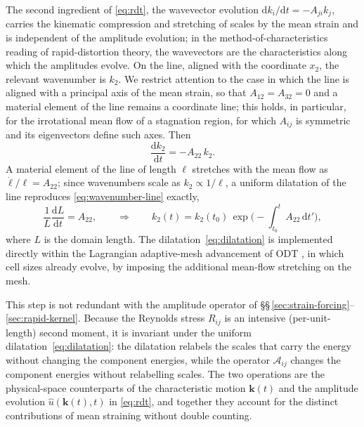 \documentclass[lineno]{JFM-FLM_Au}
\begin{document}
The second ingredient of \eqref{eq:rdt}, the wavevector evolution
$\mathrm{d}k_i/\mathrm{d}t=-A_{ji}k_j$, carries the kinematic compression
and stretching of scales by the mean strain and is independent of the
amplitude evolution; in the method-of-characteristics reading of
rapid-distortion theory, the wavevectors are the characteristics along
which the amplitudes evolve. On the line, aligned with the coordinate
$x_2$, the relevant wavenumber is $k_2$. We restrict attention to the case
in which the line is aligned with a principal axis of the mean strain, so
that $A_{12}=A_{32}=0$ and a material element of the line remains a
coordinate line; this holds, in particular, for the irrotational mean flow
of a stagnation region, for which $A_{ij}$ is symmetric and its
eigenvectors define such axes. Then
\begin{equation}
  \frac{\mathrm{d}k_2}{\mathrm{d}t}=-A_{22}\,k_2 .
  \label{eq:wavenumber-line}
\end{equation}
A material element of the line of length $\ell$ stretches with the mean
flow as $\dot{\ell}/\ell=A_{22}$; since wavenumbers scale as $k_2\propto
1/\ell$, a uniform dilatation of the line reproduces
\eqref{eq:wavenumber-line} exactly,
\begin{equation}
  \frac{1}{L}\frac{\mathrm{d}L}{\mathrm{d}t}=A_{22},
  \qquad\Longrightarrow\qquad
  k_2(t)=k_2(t_0)\,\exp\!\Big(\!-\!\int_{t_0}^{t}A_{22}\,\mathrm{d}t'\Big),
  \label{eq:dilatation}
\end{equation}
where $L$ is the domain length. The dilatation~\eqref{eq:dilatation} is
implemented directly within the Lagrangian adaptive-mesh advancement of
ODT \citep{Lignell2013}, in which cell sizes already evolve, by imposing
the additional mean-flow stretching on the mesh.

This step is not redundant with the amplitude operator of
\S\S\,\ref{sec:strain-forcing}--\ref{sec:rapid-kernel}. Because the
Reynolds stress $R_{ij}$ is an intensive (per-unit-length) second moment,
it is invariant under the uniform dilatation~\eqref{eq:dilatation}: the
dilatation relabels the scales that carry the energy without changing the
component energies, while the operator $\mathcal{A}_{ij}$ changes the
component energies without relabelling scales. The two operations are the
physical-space counterparts of the characteristic motion $\boldsymbol{k}(t)$
and the amplitude evolution $\hat{u}(\boldsymbol{k}(t),t)$ in
\eqref{eq:rdt}, and together they account for the distinct contributions
of mean straining without double counting.
\end{document}
